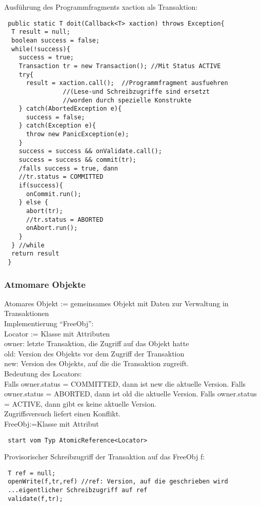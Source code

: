 \documentclass[a4paper,12pt]{scrartcl}
\begin{document}
Ausführung des Programmfragments xaction als Transaktion:
\begin{lstlisting}
 public static T doit(Callback<T> xaction) throws Exception{
  T result = null;
  boolean success = false;
  while(!success){
    success = true;
    Transaction tr = new Transaction(); //Mit Status ACTIVE
    try{
      result = xaction.call();	//Programmfragment ausfuehren 
				//(Lese-und Schreibzugriffe sind ersetzt
 				//worden durch spezielle Konstrukte
    } catch(AbortedException e){
      success = false;
    } catch(Exception e){
      throw new PanicException(e);
    }
    success = success && onValidate.call();
    success = success && commit(tr);
    /falls success = true, dann
    //tr.status = COMMITTED
    if(success){
      onCommit.run();
    } else {
      abort(tr);
      //tr.status = ABORTED
      onAbort.run();
    }
  } //while
  return result
 }
\end{lstlisting}

\subsubsection{Atmomare Objekte}

Atomares Objekt := gemeinsames Objekt mit Daten zur Verwaltung in Transaktionen\\
Implementierung "`FreeObj"':\\
Locator := Klasse mit Attributen\\
\quad owner: letzte Transaktion, die Zugriff auf das Objekt hatte\\
\quad old: Version des Objekts vor dem Zugriff der Transaktion\\
\quad new: Version des Objekts, auf die die Transaktion zugreift.\\
Bedeutung des Locators:\\
Falls owner.status = COMMITTED, dann ist new die aktuelle Version.
Falls owner.status = ABORTED, dann ist old die aktuelle Version.
Falls owner.status = ACTIVE, dann gibt es keine aktuelle Version.\\
Zugriffsversuch liefert einen Konflikt.\\
FreeObj:=Klasse mit Attribut
\begin{lstlisting}
 start vom Typ AtomicReference<Locator>
\end{lstlisting}
Provisorischer Schreibzugriff der Transaktion auf das FreeObj f:
\begin{lstlisting}
 T ref = null;
 openWrite(f,tr,ref) //ref: Version, auf die geschrieben wird
 ...eigentlicher Schreibzugriff auf ref
 validate(f,tr);
 \end{lstlisting}
\end{document}
